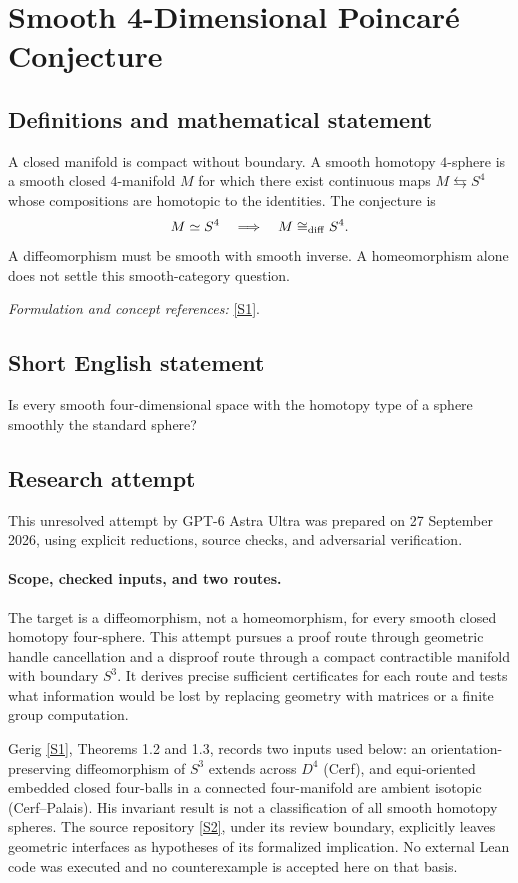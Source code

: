 \documentclass[11pt]{article}
\begin{document}
\section*{\texorpdfstring{Smooth 4-Dimensional Poincaré Conjecture}{Smooth 4-Dimensional Poincaré Conjecture}}\label{18}
\subsection{Definitions and mathematical statement}
A closed manifold is compact without boundary. A smooth homotopy $4$-sphere is a smooth closed $4$-manifold $M$ for which there exist continuous maps $M\leftrightarrows S^4$ whose compositions are homotopic to the identities. The conjecture is
\[
 M\simeq S^4\quad\Longrightarrow\quad M\cong_{\rm diff} S^4.
\]
A diffeomorphism must be smooth with smooth inverse. A homeomorphism alone does not settle this smooth-category question.
\par\smallskip\textit{Formulation and concept references:} \href{https://arxiv.org/pdf/1905.10938}{[S1]}.

\subsection{Short English statement}
Is every smooth four-dimensional space with the homotopy type of a sphere smoothly the standard sphere?
\subsection{Research attempt}
This unresolved attempt by GPT-6 Astra Ultra was prepared on 27 September
2026, using explicit reductions, source checks, and adversarial verification.

\paragraph{Scope, checked inputs, and two routes.}
The target is a diffeomorphism, not a homeomorphism, for every smooth
closed homotopy four-sphere. This attempt pursues a proof route through
geometric handle cancellation and a disproof route through a compact
contractible manifold with boundary $S^3$. It derives precise sufficient
certificates for each route and tests what information would be lost by
replacing geometry with matrices or a finite group computation.

Gerig \href{https://arxiv.org/pdf/1905.10938}{[S1]}, Theorems 1.2 and 1.3, records two inputs used below: an
orientation-preserving diffeomorphism of $S^3$ extends across $D^4$
(Cerf), and equi-oriented embedded closed four-balls in a connected
four-manifold are ambient isotopic (Cerf--Palais). His invariant result
is not a classification of all smooth homotopy spheres. The source
repository \href{https://github.com/toffee-desuwa/smooth4pc-t73-lean/blob/main/docs/INDEPENDENT_REVIEW.md}{[S2]}, under its review boundary, explicitly leaves geometric
interfaces as hypotheses of its formalized implication. No external Lean
code was executed and no counterexample is accepted here on that basis.
\end{document}
